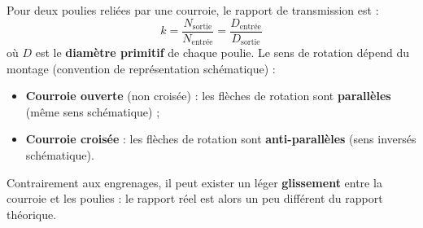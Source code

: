 \documentclass[11pt]{article}
\begin{document}
\begin{propriete}
Pour deux poulies reliées par une courroie, le rapport de transmission est :
\[ k = \frac{N_{\text{sortie}}}{N_{\text{entrée}}} = \frac{D_{\text{entrée}}}{D_{\text{sortie}}} \]
où $D$ est le \textbf{diamètre primitif} de chaque poulie. Le sens de rotation dépend du montage (convention de représentation schématique) :
\begin{itemize}
\item \textbf{Courroie ouverte} (non croisée) : les flèches de rotation sont \textbf{parallèles} (même sens schématique) ;
\item \textbf{Courroie croisée} : les flèches de rotation sont \textbf{anti-parallèles} (sens inversés schématique).
\end{itemize}
Contrairement aux engrenages, il peut exister un léger \textbf{glissement} entre la courroie et les poulies : le rapport réel est alors un peu différent du rapport théorique.
\end{propriete}
\end{document}
